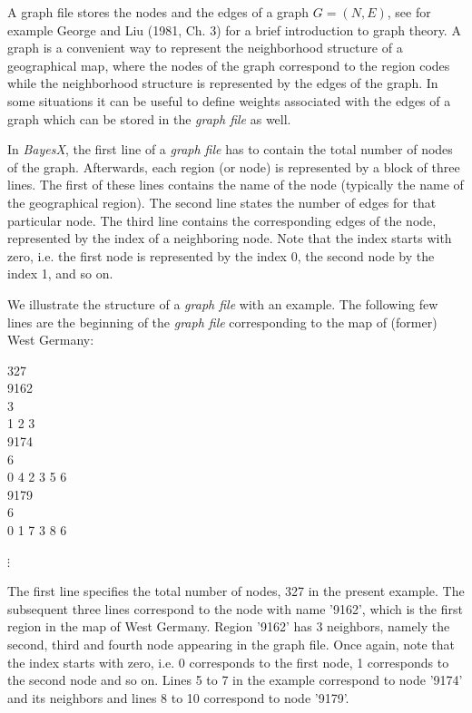 A graph file stores the nodes and the edges of a graph $G =
(N,E)$, see for example George and Liu (1981, Ch. 3) for a brief
introduction to graph theory. A graph is a convenient way to
represent the neighborhood structure of a geographical map, where
the nodes of the graph correspond to the region codes while the
neighborhood structure is represented by the edges of the graph.
In some situations it can be useful to define weights associated
with the edges of a graph which can be stored in the {\em graph
file} as well.

In {\em BayesX}, the first line of a {\em graph file} has to
contain the total number of nodes of the graph. Afterwards, each
region (or node) is represented by a block of three lines. The
first of these lines contains the name of the node (typically the
name of the geographical region). The second line states the
number of edges for that particular node. The third line contains
the corresponding edges of the node, represented by the index of a
neighboring node. Note that the index starts with zero, i.e. the
first node is represented by the index 0, the second node by the
index 1, and so on.

We illustrate the structure of a {\em graph file} with an example. The
following few lines are the beginning
of the {\em graph file} corresponding to the map of (former) West Germany:

\footnotesize

327 \\
9162 \\
3 \\
1 2 3 \\
9174 \\
6 \\
0 4 2 3 5 6 \\
9179 \\
6 \\
0 1 7 3 8 6

\hspace{1cm} $\vdots$

\normalsize

\vspace{0.5cm}

The first line specifies the total number of nodes, 327 in the
present example. The subsequent three lines correspond to the node
with name '9162', which is the first region in the map of West
Germany. Region '9162' has 3 neighbors, namely the second, third
and fourth node appearing in the graph file. Once again, note that
the index starts with zero, i.e. 0 corresponds to the first node,
1 corresponds to the second node and so on. Lines 5 to 7 in the
example correspond to node '9174' and its neighbors and lines 8 to
10 correspond to node '9179'.

